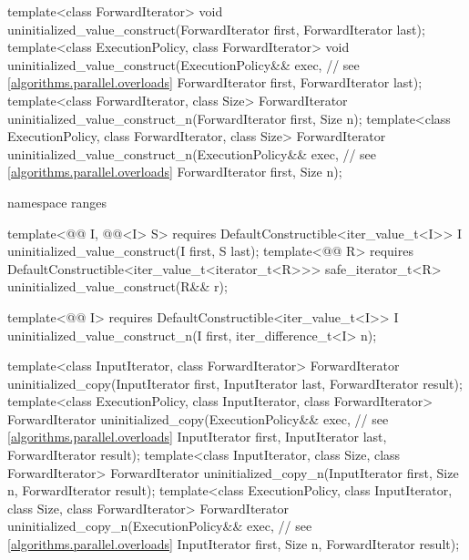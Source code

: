 \begin{codeblock}
{  template<class ForwardIterator>
    void uninitialized_value_construct(ForwardIterator first, ForwardIterator last);
  template<class ExecutionPolicy, class ForwardIterator>
    void uninitialized_value_construct(ExecutionPolicy&& exec, // see \ref{algorithms.parallel.overloads}
                                       ForwardIterator first, ForwardIterator last);
  template<class ForwardIterator, class Size>
    ForwardIterator uninitialized_value_construct_n(ForwardIterator first, Size n);
  template<class ExecutionPolicy, class ForwardIterator, class Size>
    ForwardIterator uninitialized_value_construct_n(ExecutionPolicy&& exec, // see \ref{algorithms.parallel.overloads}
                                                    ForwardIterator first, Size n);

  namespace ranges {
    template<@@ I, @@<I> S>
      requires DefaultConstructible<iter_value_t<I>>
        I uninitialized_value_construct(I first, S last);
    template<@@ R>
      requires DefaultConstructible<iter_value_t<iterator_t<R>>>
        safe_iterator_t<R> uninitialized_value_construct(R&& r);

    template<@@ I>
      requires DefaultConstructible<iter_value_t<I>>
        I uninitialized_value_construct_n(I first, iter_difference_t<I> n);
  }

  template<class InputIterator, class ForwardIterator>
    ForwardIterator uninitialized_copy(InputIterator first, InputIterator last,
                                       ForwardIterator result);
  template<class ExecutionPolicy, class InputIterator, class ForwardIterator>
    ForwardIterator uninitialized_copy(ExecutionPolicy&& exec, // see \ref{algorithms.parallel.overloads}
                                       InputIterator first, InputIterator last,
                                       ForwardIterator result);
  template<class InputIterator, class Size, class ForwardIterator>
    ForwardIterator uninitialized_copy_n(InputIterator first, Size n,
                                         ForwardIterator result);
  template<class ExecutionPolicy, class InputIterator, class Size, class ForwardIterator>
    ForwardIterator uninitialized_copy_n(ExecutionPolicy&& exec, // see \ref{algorithms.parallel.overloads}
                                         InputIterator first, Size n,
                                         ForwardIterator result);

}
\end{codeblock}
